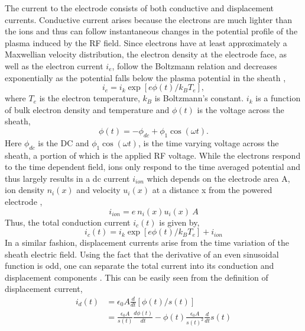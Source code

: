\documentclass[12pt]{iopart}
\begin{document}
The current to the electrode consists of both conductive and displacement currents. Conductive current arises because the electrons are much lighter than the ions and thus can follow instantaneous changes in the potential profile of the plasma induced by the RF field. Since electrons have at least approximately a Maxwellian velocity distribution, the electron density at the electrode face, as well as the electron current $i_e$, follow the Boltzmann relation and decreases exponentially as the potential falls below the plasma potential in the sheath \cite{sobolewski1995electrical},
\begin{equation} 
    i_e=i_k\exp[e\phi\left(t\right)/k_B T_e],
    \label{eqn:electron conduction}
\end{equation}
where $T_e$ is the electron temperature, $k_B$ is Boltzmann's constant. $i_k$ is a function of bulk electron density and temperature \cite{sobolewski1995electrical} and $\phi\left(t\right)$ is the voltage across the sheath,
\begin{equation} 
    \phi\left(t\right) = -\phi_{dc} + \phi_1\cos(\omega t).
    \label{eqn:sheath voltage}
\end{equation}
Here $\phi_{dc}$ is the DC and $\phi_1\cos(\omega t)$, is the time varying voltage across the sheath, a portion of which is the applied RF voltage. While the electrons respond to the time dependent field, ions only respond to the time averaged potential and thus largely results in a dc current $i_{ion}$ which depends on the electrode area A, ion density $n_i\left(x\right)$ and velocity $u_i\left(x\right)$ at a distance x from the powered electrode \cite{sobolewski1995electrical},
\begin{equation} 
    i_{ion}=e\ n_i\left(x\right)u_i\left(x\right)\ A 
\end{equation} 
Thus, the total conduction current $i_c\left(t\right)$ is given by, 
\begin{equation}
i_c\left(t\right)=i_k\exp[e\phi\left(t\right)/k_BT_e]+i_{ion}
\label{eqn:conduction_current}
\end{equation}
In a similar fashion, displacement currents arise from the time variation of the sheath electric field.  Using the fact that the derivative of an even sinusoidal function is odd, one can separate the total current into its conduction and displacement components \cite{sobolewski1995electrical}. This can be easily seen from the definition of displacement current, 
\begin{eqnarray}
    i_d\left(t\right) &=\epsilon_0A\frac{d}{dt}[\phi \left(t\right)/ s\left(t\right)] \\
    &=\frac{\epsilon_0A} {s\left(t\right)}\frac{d\phi \left(t\right)}{dt}-\phi \left(t\right)\frac{\epsilon_0A}{s\left(t\right)^2}\frac{d}{dt}s\left(t\right)
\label{eqn:displacement_current}
\end{eqnarray}
\end{document}
